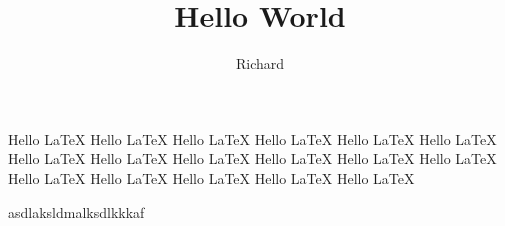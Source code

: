\documentclass{article}
\title{Hello World}
\author{Richard}
\begin{document}
    \maketitle
    
    Hello \LaTeX
    Hello \LaTeX
    Hello \LaTeX
    Hello \LaTeX
    Hello \LaTeX
    Hello \LaTeX
    Hello \LaTeX
    Hello \LaTeX
    Hello \LaTeX
    Hello \LaTeX
    Hello \LaTeX
    Hello \LaTeX
    Hello \LaTeX
    Hello \LaTeX
    Hello \LaTeX
    Hello \LaTeX
    Hello \LaTeX


    asdlaksldmalksdlkkkaf
    
    
\end{document}
